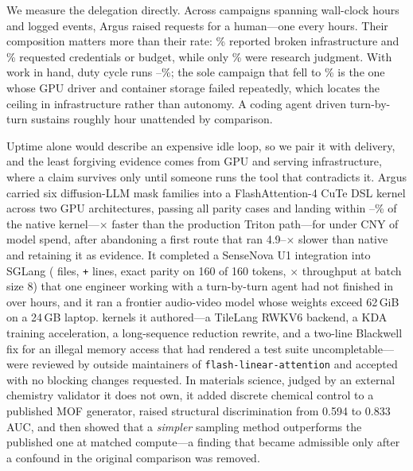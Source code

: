 \documentclass[10pt,letterpaper]{article}
\newcommand{\systemname}{Argus\xspace}
\newcommand{\code}[1]{\texttt{\small #1}}
\begin{document}
\begin{abstractbox}
We measure the delegation directly. Across \DutyCampaigns{} campaigns spanning
\DutyWallHours{} wall-clock hours and \DutyEvents{} logged events, \systemname{}
raised \DutyInterruptions{} requests for a human---one every \DutyInterval{} hours.
Their composition matters more than their rate: \DutyInfraPercent\% reported broken
infrastructure and \DutyAuthorityPercent\% requested credentials or budget, while
only \DutyJudgmentPercent\% were research judgment. With work in hand, duty cycle
runs \DutyCycleLow--\DutyCycleHigh\%; the sole campaign that fell to
\DutyDegradedCycle\% is the one whose GPU driver and container storage failed
repeatedly, which locates the ceiling in infrastructure rather than autonomy. A
coding agent driven turn-by-turn sustains roughly \CodexEndurance{} hour unattended
by comparison.

Uptime alone would describe an expensive idle loop, so we pair it with delivery, and
the least forgiving evidence comes from GPU and serving infrastructure, where a claim
survives only until someone runs the tool that contradicts it. \systemname{} carried
six diffusion-LLM mask families into a FlashAttention-4 CuTe DSL kernel across two
GPU architectures, passing all \FlashDAParity{} parity cases and landing within
\FlashDAGapLow--\FlashDAGapHigh\% of the native kernel---\FlashDAVsTriton$\times$
faster than the production Triton path---for under \FlashDACostCNY{} CNY of model
spend, after abandoning a first route that ran 4.9--\FlashDAWorstRoute$\times$ slower than
native and retaining it as evidence. It completed a SenseNova U1 integration into
SGLang (\SGLangFiles{} files, \code{+\SGLangLines{}} lines, exact parity on 160 of
160 tokens, \SGLangThroughput$\times$ throughput at batch size 8) that one engineer
working with a turn-by-turn agent had not finished in over \SGLangHumanHours{} hours,
and it ran a frontier audio-video model whose weights exceed 62\,GiB on a 24\,GB
laptop. \FLAPRTotal{} kernels it authored---a TileLang RWKV6 backend, a KDA training
acceleration, a long-sequence reduction rewrite, and a two-line Blackwell fix for an
illegal memory access that had rendered a test suite uncompletable---were reviewed by
outside maintainers of \code{flash-linear-attention} and accepted with no blocking
changes requested. In
materials science, judged by an external chemistry validator it does not own, it
added discrete chemical control to a published MOF generator, raised structural
discrimination from 0.594 to 0.833 AUC, and then showed that a \emph{simpler}
sampling method outperforms the published one at matched compute---a finding that
became admissible only after a confound in the original comparison was removed.


\end{abstractbox}
\end{document}
